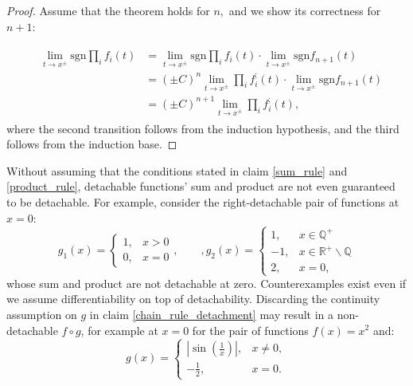 \documentclass[11pt]{book}
\begin{document}
\begin{proof}
Assume that the theorem holds for $n,$ and we show its correctness for $n+1$:

\begin{align}
&\begin{aligned}\underset{t\rightarrow x^{\pm}}{\lim}\text{sgn}\underset{i}{\prod}f_{i}\left(t\right) &=\underset{t\rightarrow x^{\pm}}{\lim}\text{sgn}\underset{i}{\prod}f_{i}\left(t\right)\cdot\underset{t\rightarrow x^{\pm}}{\lim}\text{sgn}f_{n+1}\left(t\right) \\
&=\left(\pm C\right)^{n}\underset{t\rightarrow x^{\pm}}{\lim}\underset{i}{\prod}f_{i}^{;}\left(t\right)\cdot\underset{t\rightarrow x^{\pm}}{\lim}\text{sgn}f_{n+1}\left(t\right)\\
&=\left(\pm C\right)^{n+1}\underset{t\rightarrow x^{\pm}}{\lim}\underset{i}{\prod}f_{i}^{;}\left(t\right),
\end{aligned}
\end{align}
where the second transition follows from the induction hypothesis, and the third follows from the induction base.
\end{proof}

\begin{remark}Without assuming that the conditions stated in claim \ref{sum_rule} and \ref{product_rule}, detachable functions' sum and product are not even guaranteed to be detachable.
For example, consider the right-detachable pair of functions at $x=0$:
$$g_{1}\left(x\right)=\begin{cases}
1, & x>0\\
0, & x=0
\end{cases},\qquad,g_{2}\left(x\right)=\begin{cases}
1, & x\in\mathbb{Q^{+}}\\
-1, & x\in\mathbb{R^{+}\backslash\mathbb{Q}}\\
2, & x=0,
\end{cases}$$
whose sum and product are not detachable at zero. Counterexamples exist even if we assume differentiability on top of detachability.
Discarding the continuity assumption on $g$ in claim \ref{chain_rule_detachment} may result in a non-detachable $f \circ g$, for example at $x=0$ for the pair of functions $f\left(x\right)=x^{2}$ and: $$g\left(x\right)=\begin{cases}\left|\sin\left(\frac{1}{x}\right)\right|, & x\neq0,\\-\frac{1}{2}, & x=0.\end{cases}$$
\end{remark}
\end{document}

